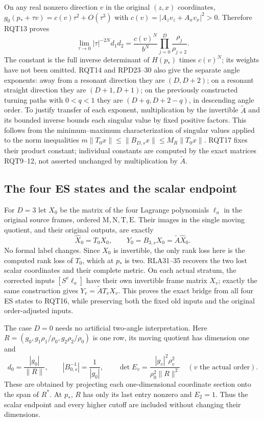 On any real nonzero direction $v$ in the original $(z,x)$
coordinates, $g_0(p_*+\tau v)=c(v)\tau^2+O(\tau^3)$ with
$c(v)=|A_zv_z+A_xv_x|^2>0$.  Therefore RQT13 proves
\[
 \lim_{\tau\to0}|\tau|^{-2N}d_1d_2
 =\frac{c(v)^N}{b^N}\prod_{j=0}^D\frac{\rho_j}{\rho_{j+2}}.
 \tag{RQT17}
\]
The constant is the full inverse determinant of $H(p_*)$
times $c(v)^N$; its weights have not been omitted.
RQT14 and RPD23--30 also give the separate angle exponents:
away from a resonant direction they are $(D,D+2)$;
on a resonant straight direction they are $(D+1,D+1)$;
on the previously constructed turning paths with $0<q<1$
they are $(D+q,D+2-q)$, in descending angle order.
To justify transfer of each exponent, multiplication by the
invertible $\widetilde A$ and its bounded inverse bounds each
singular value by fixed positive factors.  This follows from
the minimum--maximum characterization of singular values applied
to the norm inequalities
$m\|T_0x\|\le\|B_{D,s}x\|\le M_R\|T_0x\|$.
RQT17 fixes their product constant; individual constants are
computed by the exact matrices RQT9--12, not asserted unchanged
by multiplication by $\widetilde A$.

\subsection{The four ES states and the scalar endpoint}
For $D=3$ let $X_0$ be the matrix of the four Lagrange polynomials
$\ell_a$ in the original source frames, ordered
$\mathrm M,\mathrm N,\mathrm T,\mathrm E$.  Their images in the
single moving quotient, and their original outputs, are exactly
\[
 \widehat X_0=T_0X_0,\qquad
 Y_0=B_{3,s}X_0=\widetilde A\widehat X_0.
 \tag{RQT18}
\]
No formal label changes.  Since $X_0$ is invertible, the only
rank loss here is the computed rank loss of $T_0$, which at
$p_*$ is two.  RLA31--35 recovers the two lost scalar
coordinates and their complete metric.  On each actual stratum,
the corrected inputs $[S^v\ell_a]$ have their own invertible
frame matrix $X_v$; exactly the same construction gives
$Y_v=\widetilde A T_vX_v$.  This proves the exact bridge from
all four ES states to RQT16, while preserving both the fixed
old inputs and the original order-adjusted inputs.

The case $D=0$ needs no artificial two-angle interpretation.
Here $R=(g_0,g_1\rho_1/\rho_0,g_2\rho_2/\rho_0)$ is one row,
its moving quotient has dimension one and
\[
 d_0=\frac{|g_0|}{\|R\|},\qquad
 |B_{0,s}^{-1}|=\frac1{|g_0|},\qquad
 \det E_v=\frac{|g_v|^2\rho_v^2}{\rho_0^2\|R\|^2}
 \quad(v\text{ the actual order}).
 \tag{RQT19}
\]
These are obtained by projecting each one-dimensional coordinate
section onto the span of $R^*$.  At $p_*$, $R$ has only its
last entry nonzero and $E_2=1$.  Thus the scalar endpoint and
every higher cutoff are included without changing their dimensions.
